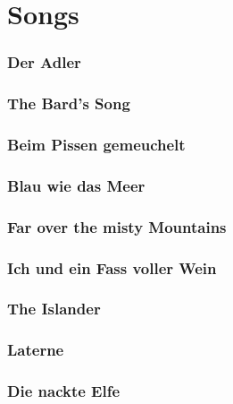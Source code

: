 \documentclass{article}
\begin{document}
\tableofcontents

\newpage

\part{Songs}

\newpage

\section{Der Adler}


\section{The Bard's Song}


\section{Beim Pissen gemeuchelt}


\section{Blau wie das Meer}


\section{Far over the misty Mountains}


\section{Ich und ein Fass voller Wein}


\section{The Islander}


\section{Laterne}


\section{Die nackte Elfe}

\end{document}
